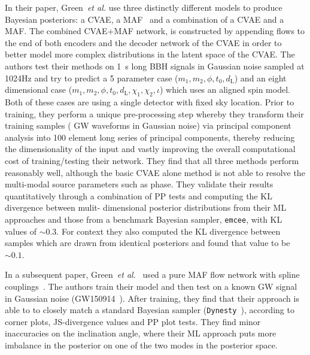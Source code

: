 In their paper, Green~\textit{et al.} use three distinctly 
different models to produce Bayesian posteriors: 
a \ac{CVAE}, a \ac{MAF}~\cite{2017arXiv170507057P} and a combination of a 
\ac{CVAE} and a \ac{MAF}.
The combined \ac{CVAE}+\ac{MAF} 
network, is constructed by appending flows to the 
end of both encoders and the decoder network of 
the \ac{CVAE} in order to better model more complex distributions 
in the latent space of the \ac{CVAE}. 
The authors test their methods on 1~s long \ac{BBH} signals in 
Gaussian noise sampled at 1024Hz and try to predict a 5 parameter case 
($m_1,m_2,\phi,t_0,d_\mathrm{L}$) and an eight 
dimensional case ($m_1,m_2,\phi,t_0,d_\mathrm{L},\chi_1,\chi_2,\iota$) 
which uses an aligned spin model. Both 
of these cases are using a single detector with fixed sky 
location. Prior to training, they perform a unique pre-processing 
step whereby they transform their training samples (
\ac{GW} waveforms in Gaussian noise) via principal component analysis 
into 100 element 
long series of principal components, thereby 
reducing the dimensionality of the input and 
vastly improving the overall computational cost of 
training/testing their network. 
They find that all three methods perform 
reasonably 
well, although the basic \ac{CVAE} alone method is not able to 
resolve the multi-modal source parameters such 
as phase. They validate their results quantitatively through a combination 
of \ac{PP} tests and computing the \ac{KL} divergence between mulit-
dimensional posterior 
distributions from their \ac{ML} approaches and those from a benchmark 
Bayesian sampler, \texttt{emcee}, with \ac{KL} values of 
$\sim 0.3$. For context they also computed the \ac{KL} divergence between 
samples which are drawn from identical posteriors and found that value to be 
$\sim 0.1$.

%
%
In a subsequent paper, 
Green~\textit{et al.}~\cite{2008.03312} used a pure \ac{MAF} flow 
network with spline couplings~\cite{2019arXiv190604032D}. The authors 
train their model and then test on a known \ac{GW} signal in 
Gaussian noise (GW150914~\cite{PhysRevLett.116.061102}). 
After training, they 
find that their approach is able to to closely match a standard 
Bayesian sampler (\texttt{Dynesty}~\cite{dynesty}), according to corner plots, 
\ac{JS}-divergence values and \ac{PP} plot tests. They find  
minor inaccuracies on the inclination angle, where their 
\ac{ML} approach puts more imbalance in the posterior on one of the 
two modes in the posterior space.  

